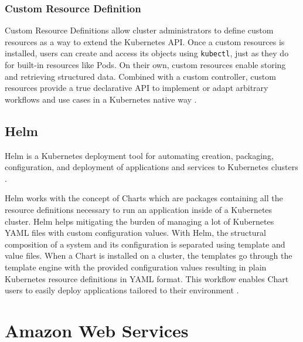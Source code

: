 \subsubsection{Custom Resource Definition}

Custom Resource Definitions allow cluster administrators to define custom resources as a way to extend the Kubernetes API. Once a custom resources is installed, users can create and access its objects using \texttt{kubectl}, just as they do for built-in resources like Pods. On their own, custom resources enable storing and retrieving structured data. Combined with a custom controller, custom resources provide a true declarative API to implement or adapt arbitrary workflows and use cases in a Kubernetes native way \cite{KubernetesCRD}.

\subsection{Helm} \label{helm}

Helm is a Kubernetes deployment tool for automating creation, packaging, configuration, and deployment of applications and services to Kubernetes clusters \cite{HelmWhatIs}.

Helm works with the concept of Charts which are packages containing all the resource definitions necessary to run an application inside of a Kubernetes cluster. Helm helps mitigating the burden of managing a lot of Kubernetes YAML files with custom configuration values. With Helm, the structural composition of a system and its configuration is separated using template and value files. When a Chart is installed on a cluster, the templates go through the template engine with the provided configuration values resulting in plain Kubernetes resource definitions in YAML format.  This workflow enables Chart users to easily deploy applications tailored to their environment \cite{Helm}.

\section{Amazon Web Services}

